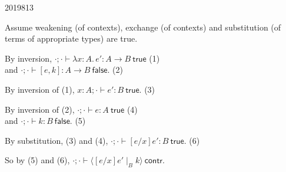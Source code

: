 \documentclass[10pt,\jkfside,a4paper]{article}
\begin{document}
\begin{examquestion}{2019}{8}{13}
\begin{enumerate}
\begin{enumerate}
{                        Assume weakening (of contexts), exchange (of contexts) and substitution (of terms of appropriate types) are true.

                        By inversion, $\cdot; \cdot \vdash \lambda x : A.\, e' : A \to B\ \mathsf{true}$ \hfill (1) \\
                        and $\cdot; \cdot \vdash [e, k] : A \to B\ \mathsf{false}$. \hfill (2)

                        By inversion of (1), $x : A; \cdot \vdash e' : B\ \mathsf{true}$. \hfill (3)

                        By inversion of (2), $\cdot; \cdot \vdash e : A\ \mathsf{true}$ \hfill (4) \\
                        and $\cdot; \cdot \vdash k : B\ \mathsf{false}$. \hfill (5)

                        By substitution, (3) and (4), $\cdot; \cdot \vdash [e/x]e' : B\ \mathsf{true}$. \hfill (6)

                        So by (5) and (6), $\cdot; \cdot \vdash \langle [e/x]e' \mid_B k \rangle\ \mathsf{contr}$.
                    }

            \end{enumerate}

    \end{enumerate}

\end{examquestion}
\end{document}
